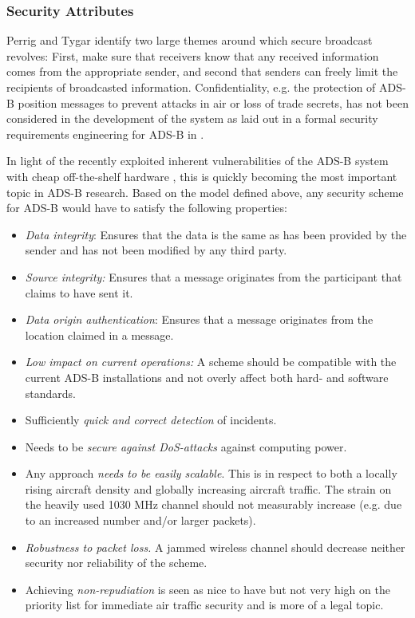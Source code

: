 \documentclass[english]{IEEEtran}
\begin{document}
\begin{itemize}
\end{itemize}

\subsubsection*{Security Attributes}

Perrig and Tygar \cite{Perrig2003} identify two large themes around
which secure broadcast revolves: First, make sure that receivers know
that any received information comes from the appropriate sender, and
second that senders can freely limit the recipients of broadcasted
information. Confidentiality, e.g. the protection of ADS-B position
messages to prevent attacks in air or loss of trade secrets, has not
been considered in the development of the system as laid out in a
formal security requirements engineering for ADS-B in \cite{haley2008security}.

In light of the recently exploited inherent vulnerabilities of the
ADS-B system with cheap off-the-shelf hardware \cite{Costin,schafer2013experimental},
this is quickly becoming the most important topic in ADS-B research.
Based on the model defined above, any security scheme for ADS-B would
have to satisfy the following properties:
\begin{itemize}
\item \emph{Data integrity}: Ensures that the data is the same as has been
provided by the sender and has not been modified by any third party.
\item \emph{Source integrity: }Ensures that a message originates from the
participant that claims to have sent it. 
\item \emph{Data origin authentication}: Ensures that a message originates
from the location claimed in a message.
\item \emph{Low impact on current operations:} A scheme should be compatible
with the current ADS-B installations and not overly affect both hard-
and software standards.
\item Sufficiently\emph{ quick and correct detection} of incidents.
\item Needs to be \emph{secure against DoS-attacks} against computing power.
\item Any approach \emph{needs to be easily scalable}. This is in respect
to both a locally rising aircraft density and globally increasing
aircraft traffic. The strain on the heavily used 1030 MHz channel
should not measurably increase (e.g. due to an increased number and/or
larger packets).
\item \emph{Robustness to packet loss.} A jammed wireless channel should
decrease neither security nor reliability of the scheme.
\item Achieving \emph{non-repudiation} is seen as nice to have but not very
high on the priority list for immediate air traffic security and is
more of a legal topic.\\

\end{itemize}
\end{document}
